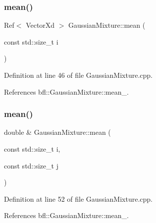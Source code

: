 \mbox{\label{classbfl_1_1GaussianMixture_ad57440f7d524e5129afe70fc36f4fe99}} 
\subsubsection{\texorpdfstring{mean()}{mean()}\hspace{0.1cm}{\footnotesize\ttfamily [2/6]}}
{\footnotesize\ttfamily Ref$<$ Vector\+Xd $>$ Gaussian\+Mixture\+::mean (\begin{DoxyParamCaption}\item[{const std\+::size\+\_\+t}]{i }\end{DoxyParamCaption})\hspace{0.3cm}{\ttfamily [inherited]}}



Definition at line 46 of file Gaussian\+Mixture.\+cpp.



References bfl\+::\+Gaussian\+Mixture\+::mean\+\_\+.

\mbox{\label{classbfl_1_1GaussianMixture_a21013d54d99ca5bfd1ec566a0815821e}} 
\subsubsection{\texorpdfstring{mean()}{mean()}\hspace{0.1cm}{\footnotesize\ttfamily [3/6]}}
{\footnotesize\ttfamily double \& Gaussian\+Mixture\+::mean (\begin{DoxyParamCaption}\item[{const std\+::size\+\_\+t}]{i,  }\item[{const std\+::size\+\_\+t}]{j }\end{DoxyParamCaption})\hspace{0.3cm}{\ttfamily [inherited]}}



Definition at line 52 of file Gaussian\+Mixture.\+cpp.



References bfl\+::\+Gaussian\+Mixture\+::mean\+\_\+.

\mbox{\label{classbfl_1_1GaussianMixture_ad420f06f7680003453f64fd18bbb67da}} 
